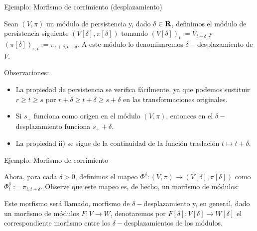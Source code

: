 \documentclass{beamer}
\def\R\re
\def \R{{\bf R}}
\def \re{{\mathbb R}}
\begin{document}
\begin{frame}{Ejemplo: Morfismo de corrimiento (desplazamiento)}

Sean $(V,\pi)$ un módulo de persistencia y, dado $\delta\in\R$, definimos el módulo de persistencia siguiente $(V[\delta], \pi[\delta])$ tomando $(V[\delta])_t:=V_{t+\delta}$ y $(\pi[\delta])_{s,t}:=\pi_{s+\delta,t+\delta}$. A este módulo lo denominaremos $\delta-$desplazamiento de $V$.

\pause
\begin{block}{Observaciones:}
\begin{itemize}
    \item La propiedad de persistencia se verifica fácilmente, ya que podemos sustituir $r\geq t\geq s$ por $r+\delta \geq t+\delta \geq s+\delta$ en las transformaciones originales.
\pause
    \item Si $s_+$ funciona como origen en el módulo $(V, \pi)$, entonces en el $\delta-$desplazamiento funciona $s_++\delta$.
\pause
    \item La propiedad ii) se sigue de la continuidad de la función traslación $t\mapsto t+\delta$.
\end{itemize}
    
\end{block}

\end{frame}


\begin{frame}{Ejemplo: Morfismo de corrimiento}

Ahora, para cada $\delta>0$, definimos el mapeo $\Phi^\delta:(V, \pi)\rightarrow (V[\delta], \pi[\delta])$ como $\Phi^{\delta}_t:=\pi_{t,t+\delta}$. \pause Observe que este mapeo es, de hecho, un morfismo de módulos:

\centerline{
\xymatrixcolsep{5pc}
\xymatrixrowsep{5pc}
}

\pause

Este morfismo será llamado, morfismo de $\delta-$desplazamiento y, en general, dado un morfismo de módulos $F:V\rightarrow W$, denotaremos por $F[\delta]:V[\delta]\rightarrow W[\delta]$ el correspondiente morfismo entre los $\delta-$desplazamientos de los módulos.

\end{frame}
\end{document}
